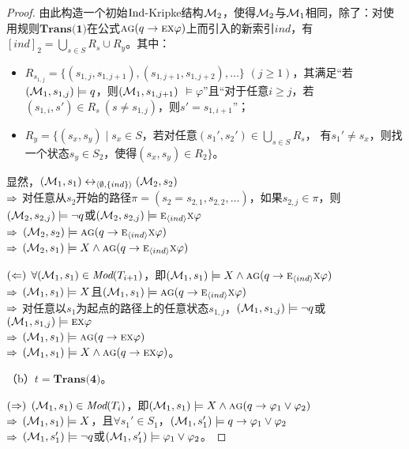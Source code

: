 \begin{proof}
	由此构造一个初始$\textrm{Ind}$-Kripke结构${\cal M}_2$，使得${\cal M}_2$与${\cal M}_1$相同，除了：对使用规则$\textbf{Trans(1)}$在公式$\textsc{a}\textsc{g}(q \rightarrow \textsc{e} \textsc{x} \varphi)$上而引入的新索引$ind$，有$[ind]_2=\bigcup_{s\in S} R_s \cup R_y$。其中：
	\begin{itemize}
		\item $R_{s_{1,j}}=\{(s_{1,j}, s_{1,j+1}), (s_{1,j+1}, s_{1,j+2}),\dots\}$ $(j\geq 1)$，其满足“若$({\cal M}_1,s_{1,j}) \models q$，则$({\cal M}_1,s_{1,j+1})$ $\models \varphi$”且“对于任意$i\geq j$，若$(s_{1,i}, s') \in R_s\ (s \not= s_{1,j})$，则$s'=s_{1,i+1}$”；
		\item $R_y=\{(s_x,s_y)\mid s_x\in S$，若对任意$(s_1',s_2') \in \bigcup_{s\in S} R_s$， 有$s_1'\not= s_x$，则找一个状态$s_y\in S_2$，使得$(s_x,s_y)\in R_2\}$。
	\end{itemize}
	
	显然，$({\cal M}_1,s_1) \leftrightarrow_{{\langle{\emptyset,\{ind\}}\rangle}} ({\cal M}_2,s_2)$\\
	$\Rightarrow$ 对任意从$s_2$开始的路径$\pi=( s_2= s_{2,1} , s_{2,2}, \dots)$，如果$s_{2,j} \in \pi$，则$({\cal M}_2,s_{2,j}) \models \neg q$或$({\cal M}_2,s_{2,j}) \models \textsc{e}_{{\langle{ind}\rangle}} \textsc{x} \varphi$\\
	$\Rightarrow$ $({\cal M}_2,s_2)\models \textsc{a}\textsc{g}(q \rightarrow \textsc{e}_{{\langle{ind}\rangle}} \textsc{x} \varphi)$\\
	$\Rightarrow$ $({\cal M}_2,s_1) \models X \wedge \textsc{a}\textsc{g}(q \rightarrow \textsc{e}_{{\langle{ind}\rangle}} \textsc{x} \varphi)$
	
	$(\Leftarrow)$ $\forall ({\cal M}_1,s_1) \in \textit{Mod}(T_{i+1})$，即$({\cal M}_1,s_1) \models X \wedge \textsc{a} \textsc{g}(q \rightarrow \textsc{e}_{{\langle{ind}\rangle}} \textsc{x} \varphi )$\\
	$\Rightarrow$ $({\cal M}_1,s_1) \models X$且$({\cal M}_1,s_1) \models \textsc{a} \textsc{g}(q \rightarrow \textsc{e}_{{\langle{ind}\rangle}} \textsc{x} \varphi)$\\
	$\Rightarrow$ 对任意以$s_1$为起点的路径上的任意状态$s_{1,j}$，$({\cal M}_1,s_{1,j}) \models \neg q$或$({\cal M}_1,s_{1,j}) \models \textsc{e}\textsc{x}\varphi$\\
	$\Rightarrow$ $({\cal M}_1,s_1) \models \textsc{a}\textsc{g}(q \rightarrow \textsc{e} \textsc{x} \varphi)$\\
	$\Rightarrow$ $({\cal M}_1,s_1) \models X \wedge \textsc{a}\textsc{g}(q \rightarrow \textsc{e} \textsc{x} \varphi)$。
	
	（b）$t=\textbf{Trans(4)}$。
	
	$(\Rightarrow)$	$({\cal M}_1,s_1) \in \textit{Mod}(T_i)$，即$({\cal M}_1,s_1) \models X \wedge \textsc{a}\textsc{g} (q \rightarrow \varphi_1 \vee \varphi_2)$ \\
	$\Rightarrow$ $({\cal M}_1,s_1) \models X$，且$\forall s_1'\in S_1$，$({\cal M}_1, s_1') \models q \rightarrow \varphi_1 \vee \varphi_2$\\
	$\Rightarrow$ $({\cal M}_1,s_1')\models \neg q$或$({\cal M}_1,s_1')\models \varphi_1 \vee \varphi_2$。
	

\end{proof}

